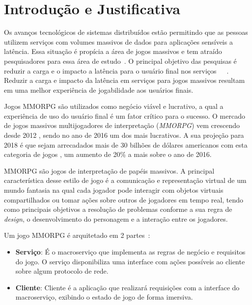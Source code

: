 \section{Introdução e Justificativa}
\label{sec:int}

Os avanços tecnológicos de sistemas distribuídos estão permitindo que as pessoas utilizem serviços com volumes massivos de dados para aplicações sensíveis a latência.
%
Essa situação é propícia a área de jogos massivos e tem atraído pesquisadores para essa área de estudo~\cite{mmo_analytic}.
%
O principal objetivo das pesquisas é reduzir a carga e o impacto a latência para o usuário final nos serviços~\cite{1417630}~\cite{6267019}~\cite{6063041}.
%
Reduzir a carga e impacto da latência em serviços para jogos massivos resultam em uma melhor experiência de jogabilidade aos usuários finais\cite{1417630}.


Jogos \ac{MMORPG} são utilizados como negócio viável e lucrativo, a qual a experiência de uso do usuário final é um fator crítico para o sucesso.
%
O mercado de jogos massivos multijogadores de interpretação (\textit{MMORPG}) vem crescendo desde 2012 \cite{new_york_times}, sendo no ano de 2016 um dos mais lucrativos\cite{statista_2016}.
%
A sua projeção para 2018 é que sejam arrecadados mais de 30 bilhões de dólares americanos com esta categoria de jogos \cite{statista_2018}, um aumento de 20\% a mais sobre o ano de 2016.



\ac{MMORPG} são jogos de interpretação de papéis massivos.
%
A principal característica desse estilo de jogo é a comunicação e representação virtual de um mundo fantasia na qual cada jogador pode interagir com objetos virtuais compartilhados ou tomar ações sobre outros de jogadores em tempo real, tendo como principais objetivos a resolução de problemas conforme a sua regra de \textit{design}, o desenvolvimento do personagem e a interação entre os jogadores\cite{video_game_technologies}.
%

Um jogo \ac{MMORPG} é arquitetado em 2 partes~\cite{mmo_analytic}:
\begin{itemize}
  \item \textbf{Serviço}: É o macroserviço que implementa as regras de negócio e requisitos do jogo.
  O serviço disponibiliza uma interface com ações possíveis ao cliente sobre algum protocolo de rede.
  \item \textbf{Cliente}: Cliente é a aplicação que realizará requisições com a interface do macroserviço, exibindo o estado de jogo de forma imersiva.
\end{itemize}

